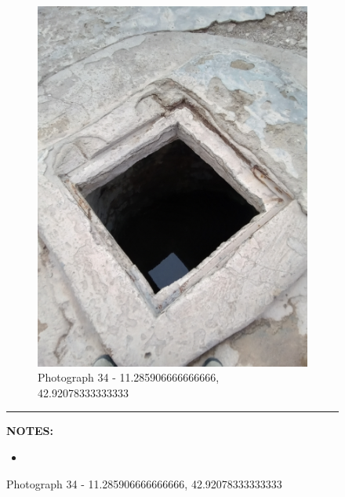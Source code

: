 \documentclass[12pt, letterpaper]{article}
\begin{document}
\begin{figure}[h]
{{                \begin{subfigure}{\linewidth}
                    \centering
                    \includegraphics[width=0.37\textheight, angle=-90]{photos/10.png}
                    \captionsetup{width=0.8\linewidth}
                    \caption{Photograph 34 - 11.285906666666666, 42.92078333333333}
                \end{subfigure}
                    \vspace{1mm}
                    \hrule
                \begin{minipage}[c][4.5cm][t]{1\textwidth} 
                    \begin{minipage}[t][2cm][t]{0.5\textwidth} 
	 				\vspace{2mm}
					\centering
					\textbf{\small{NOTES:}} \\ 
					\raggedright 
					\begin{itemize}
            					\item \footnotesize{}

\end{itemize}
\end{minipage}
\end{minipage}}}
\end{figure}
\end{document}
